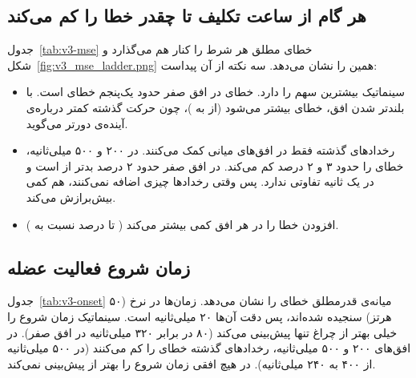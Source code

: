 \begin{table}[htbp]
\centering\small
\caption{ هر نفر با  واقعی، همه‌ی ها.}
\label{tab:v3-subjects}

\end{table}


\subsection{هر گام از ساعت تکلیف تا  چقدر خطا را کم می‌کند}

جدول~\ref{tab:v3-mse} خطای مطلق هر شرط را کنار هم می‌گذارد و شکل~\ref{fig:v3_mse_ladder.png} همین را نشان می‌دهد. سه نکته از آن پیداست:

\begin{itemize}
\item سینماتیک بیشترین سهم را دارد. خطای  در افق صفر حدود یک‌پنجم خطای  است. با بلندتر شدن افق، خطای  بیشتر می‌شود (از  به )، چون حرکت گذشته کمتر درباره‌ی آینده‌ی دورتر می‌گوید.
\item رخدادهای گذشته فقط در افق‌های میانی کمک می‌کنند. در ۲۰۰ و ۵۰۰ میلی‌ثانیه،  خطای  را حدود ۳ و ۲ درصد کم می‌کند. در افق صفر  حدود ۲ درصد بدتر از  است و در یک ثانیه تفاوتی ندارد. پس وقتی رخدادها چیزی اضافه نمی‌کنند،  هم کمی بیش‌برازش می‌کند.
\item افزودن  خطا را در هر افق کمی بیشتر می‌کند ( تا  درصد نسبت به ).
\end{itemize}

\begin{table}[htbp]
\centering\small
\caption{میانگین خطای مطلق ( در حوزه‌ی مدل، میانگین پنج عضله) هر شرط روی همه‌ی های آزمون.}
\label{tab:v3-mse}
\resizebox{\textwidth}{!}{}
\end{table}


\subsection{زمان شروع فعالیت عضله}

جدول~\ref{tab:v3-onset} میانه‌ی قدرمطلق خطای  را نشان می‌دهد. زمان‌ها در نرخ  (۵۰ هرتز) سنجیده شده‌اند، پس دقت آن‌ها ۲۰ میلی‌ثانیه است. سینماتیک زمان شروع را خیلی بهتر از چراغ تنها پیش‌بینی می‌کند (۸۰ در برابر ۳۲۰ میلی‌ثانیه در افق صفر). در افق‌های ۲۰۰ و ۵۰۰ میلی‌ثانیه، رخدادهای گذشته خطای  را کم می‌کنند (در ۵۰۰ میلی‌ثانیه از ۴۰۰ به ۲۴۰ میلی‌ثانیه).  در هیچ افقی زمان شروع را بهتر از  پیش‌بینی نمی‌کند.

